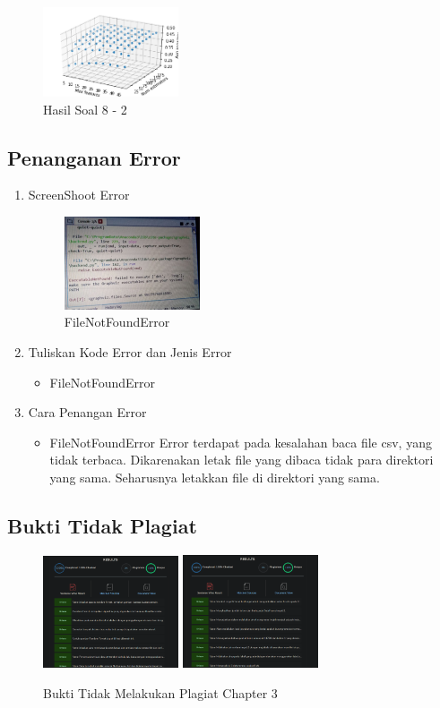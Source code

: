 \begin{enumerate}
\begin{itemize}
	\begin{figure}[H]
	\centering
		\includegraphics[width=4cm]{figures/1174009/tugas3/materi/31.PNG}
		\caption{Hasil Soal 8 - 2}
	\end{figure}
\end{itemize}
\end{enumerate}

\subsection{Penanganan Error}
\begin{enumerate}
	\item ScreenShoot Error
	\begin{figure}[H]
		\includegraphics[width=4cm]{figures/1174009/tugas2/error/1.PNG}
		\centering
		\caption{FileNotFoundError}
	\end{figure}
	\item Tuliskan Kode Error dan Jenis Error
	\begin{itemize}
		\item FileNotFoundError
	\end{itemize}
	\item Cara Penangan Error
	\begin{itemize}
		\item FileNotFoundError
		\hfill\break
		Error terdapat pada kesalahan baca file csv, yang tidak terbaca. Dikarenakan letak file yang dibaca tidak para direktori yang sama. Seharusnya letakkan file di direktori yang sama. 
	\end{itemize}
\end{enumerate}
\subsection{Bukti Tidak Plagiat}
\begin{figure}[H]
\centering
	\includegraphics[width=4cm]{figures/1174009/tugas3/buktiplagiat/1.PNG}
	\includegraphics[width=4cm]{figures/1174009/tugas3/buktiplagiat/2.PNG}
	\caption{Bukti Tidak Melakukan Plagiat Chapter 3}
\end{figure}

